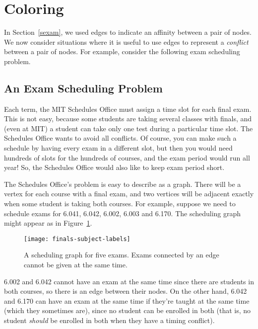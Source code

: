 \section{Coloring}\label{sec:coloring}

In Section~\ref{sexam}, we used edges to indicate an affinity between
a pair of nodes.  We now consider situations where it is useful to use
edges to represent a \emph{conflict} between a pair of nodes.  For
example, consider the following exam scheduling problem.

\subsection{An Exam Scheduling Problem}

Each term, the MIT Schedules Office must assign a time slot for each
final exam.  This is not easy, because some students are taking
several classes with finals, and (even at MIT) a student can take only
one test during a particular time slot.  The Schedules Office wants to
avoid all conflicts.  Of course, you can make such a schedule by
having every exam in a different slot, but then you would need
hundreds of slots for the hundreds of courses, and the exam period
would run all year!  So, the Schedules Office would also like to keep
exam period short.

The Schedules Office's problem is easy to describe as a graph.  There
will be a vertex for each course with a final exam, and two vertices
will be adjacent exactly when some student is taking both courses.
For example, suppose we need to schedule exams for 6.041, 6.042,
6.002, 6.003 and 6.170.  The scheduling graph might appear as in
Figure~\ref{fig:5R}.

\begin{figure}\redrawn

\texttt{[image: finals-subject-labels]}

\caption{A scheduling graph for five exams.  Exams connected by an
  edge cannot be given at the same time.}

\label{fig:5R}

\end{figure}

6.002 and 6.042 cannot have an exam at the same time since there are
students in both courses, so there is an edge between their nodes.  On the
other hand, 6.042 and 6.170 can have an exam at the same time if they're
taught at the same time (which they sometimes are), since no student can
be enrolled in both (that is, no student \emph{should} be enrolled in both
when they have a timing conflict).

